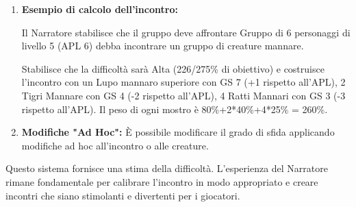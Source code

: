 \documentclass[a4paper,twoside,openany]{book}
\begin{document}
\begin{enumerate}[leftmargin=*]
	\item \textbf{Esempio di calcolo dell'incontro:}
	
	Il Narratore stabilisce che il gruppo deve affrontare Gruppo di 6 personaggi di livello 5 (APL 6) debba incontrare un gruppo di creature mannare.
	
	Stabilisce che la difficoltà sarà Alta (226/275\% di obiettivo) e costruisce l'incontro con un Lupo mannaro superiore con GS 7 (+1 rispetto all'APL), 2 Tigri Mannare con GS 4 (-2 rispetto all'APL), 4 Ratti Mannari con GS 3 (-3 rispetto all'APL). Il peso di ogni mostro è 80\%+2*40\%+4*25\% = 260\%.
	
	\item \textbf{Modifiche "Ad Hoc":} È possibile modificare il grado di sfida applicando modifiche ad hoc all'incontro o alle creature.
\end{enumerate}


Questo sistema fornisce una stima della difficoltà. L'esperienza del Narratore rimane fondamentale per calibrare l'incontro in modo appropriato e creare incontri che siano stimolanti e divertenti per i giocatori.


\medskip


%


\pagebreak




{\scriptsize\printindex}
\end{document}
